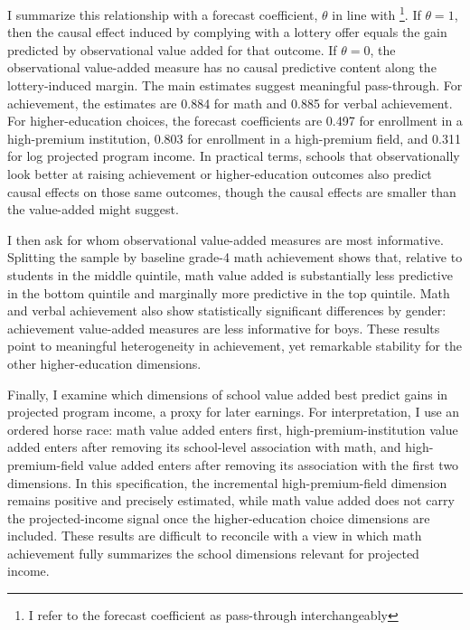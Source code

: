 \documentclass[a4paper, article, english, oneside, unknownkeysallowed, 12pt]{memoir}
\begin{document}
I summarize this relationship with a forecast coefficient, $\theta$ in line with \textcite{angrist_leveraging_2017}\footnote{I refer to the forecast coefficient as pass-through interchangeably}.
If $\theta=1$, then the causal effect induced by complying with a lottery offer equals the gain predicted by observational value added for that outcome.
If $\theta=0$, the observational value-added measure has no causal predictive content along the lottery-induced margin.
The main estimates suggest meaningful pass-through.
For achievement, the estimates are 0.884 for math and 0.885 for verbal achievement.
For higher-education choices, the forecast coefficients are 0.497 for enrollment in a high-premium institution, 0.803 for enrollment in a high-premium field, and 0.311 for log projected program income.
In practical terms, schools that observationally look better at raising achievement or higher-education outcomes also predict causal effects on those same outcomes, though the causal effects are smaller than the value-added might suggest.

I then ask for whom observational value-added measures are most informative.
Splitting the sample by baseline grade-4 math achievement shows that, relative to students in the middle quintile, math value added is substantially less predictive in the bottom quintile and marginally more predictive in the top quintile.
Math and verbal achievement also show statistically significant differences by gender: achievement value-added measures are less informative for boys.
These results point to meaningful heterogeneity in achievement, yet remarkable stability for the other higher-education dimensions.

Finally, I examine which dimensions of school value added best predict gains in projected program income, a proxy for later earnings.
For interpretation, I use an ordered horse race: math value added enters first, high-premium-institution value added enters after removing its school-level association with math, and high-premium-field value added enters after removing its association with the first two dimensions.
In this specification, the incremental high-premium-field dimension remains positive and precisely estimated, while math value added does not carry the projected-income signal once the higher-education choice dimensions are included.
These results are difficult to reconcile with a view in which math achievement fully summarizes the school dimensions relevant for projected income.
\end{document}

